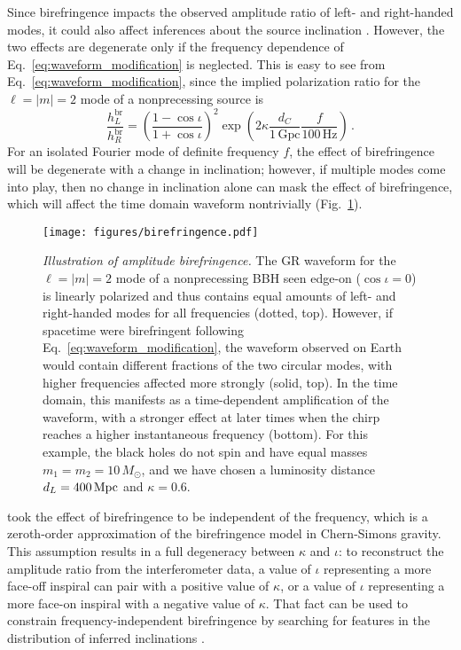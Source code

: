 \documentclass[aps,prd,twocolumn,superscriptaddress,preprintnumbers,floatfix,nofootinbib]{revtex4-2}
\begin{document}
Since birefringence impacts the observed amplitude ratio of left- and right-handed modes, it could also affect inferences about the source inclination \cite{Alexander:2009tp}.
However, the two effects are degenerate only if the frequency dependence of Eq.~\eqref{eq:waveform_modification} is neglected.
This is easy to see from Eq.~\eqref{eq:waveform_modification}, since the implied polarization ratio for the $\ell = |m| = 2$ mode of a nonprecessing source is
\begin{equation}
    \frac{h_{L}^\mathrm{br}}{h_{R}^\mathrm{br}}=\left(\frac{1-\cos\iota}{1+\cos\iota}\right)^2
    \exp\left({2\kappa\frac{d_C}{1\, \mathrm{Gpc}}\frac{f}{100\, \mathrm{Hz}}}\right)\, .
    \label{eq:modified_amplitude_ratio}
\end{equation}
For an isolated Fourier mode of definite frequency $f$, the effect of birefringence will be degenerate with a change in inclination; however, if multiple modes come into play, then no change in inclination alone can mask the effect of birefringence, which will affect the time domain waveform nontrivially (Fig.~\ref{fig:birefringence}).

\begin{figure}
    \texttt{[image: figures/birefringence.pdf]}
    \caption{
        \emph{Illustration of amplitude birefringence.} The GR waveform for the $\ell=|m|=2$ mode of a nonprecessing BBH seen edge-on ($\cos\iota = 0$) is linearly polarized and thus contains equal amounts of left- and right-handed modes for all frequencies (dotted, top).
        However, if spacetime were birefringent following Eq.~\protect\eqref{eq:waveform_modification}, the waveform observed on Earth would contain different fractions of the two circular modes, with higher frequencies affected more strongly (solid, top). 
        In the time domain, this manifests as a time-dependent amplification of the waveform, with a stronger effect at later times when the chirp reaches a higher instantaneous frequency (bottom).
        For this example, the black holes do not spin and have equal masses $m_1 = m_2 = 10\, M_\odot$, and we have chosen a luminosity distance $d_L = 400\, {\rm Mpc}$ and $\kappa = 0.6$.
        }
    \label{fig:birefringence}
\end{figure}

\citet{Okounkova_2022} took the effect of birefringence to be independent of the frequency, which is a zeroth-order approximation of the birefringence model in Chern-Simons gravity.
This assumption results in a full degeneracy between $\kappa$ and $\iota$:
to reconstruct the amplitude ratio from the interferometer data, a value of $\iota$ representing a more face-off inspiral can pair with a positive value of $\kappa$, or a value of $\iota$ representing a more face-on inspiral with a negative value of $\kappa$.
That fact can be used to constrain frequency-independent birefringence by searching for features in the distribution of inferred inclinations \cite{Okounkova_2022}.
\end{document}
